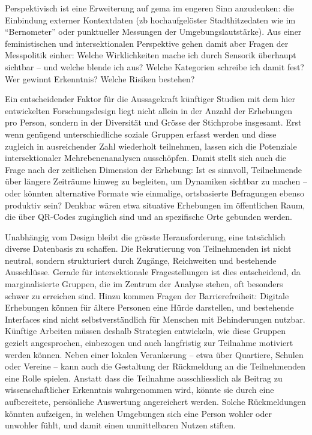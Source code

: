 Perspektivisch ist eine Erweiterung auf \gls{gema} im engeren Sinn anzudenken: die Einbindung externer Kontextdaten (\gls{zb} hochaufgelöster Stadthitzedaten wie im \enquote{Bernometer} \parencite[siehe][]{burgerModellingSpatialPattern2021} oder punktueller Messungen der Umgebungslautstärke). Aus einer feministischen und intersektionalen Perspektive gehen damit aber Fragen der Messpolitik einher: Welche Wirklichkeiten mache ich durch Sensorik überhaupt sichtbar -- und welche blende ich aus? Welche Kategorien schreibe ich damit fest? Wer gewinnt Erkenntnis? Welche Risiken bestehen?

Ein entscheidender Faktor für die Aussagekraft künftiger Studien mit dem hier entwickelten Forschungsdesign liegt nicht allein in der Anzahl der Erhebungen pro Person, sondern in der Diversität und Grösse der Stichprobe insgesamt. Erst wenn genügend unterschiedliche soziale Gruppen erfasst werden und diese zugleich in ausreichender Zahl wiederholt teilnehmen, lassen sich die Potenziale intersektionaler Mehrebenenanalysen ausschöpfen. Damit stellt sich auch die Frage nach der zeitlichen Dimension der Erhebung: Ist es sinnvoll, Teilnehmende über längere Zeiträume hinweg zu begleiten, um Dynamiken sichtbar zu machen -- oder könnten alternative Formate wie einmalige, ortsbasierte Befragungen ebenso produktiv sein? Denkbar wären etwa situative Erhebungen im öffentlichen Raum, die über QR-Codes zugänglich sind und an spezifische Orte gebunden werden.

Unabhängig vom Design bleibt die grösste Herausforderung, eine tatsächlich diverse Datenbasis zu schaffen. Die Rekrutierung von Teilnehmenden ist nicht neutral, sondern strukturiert durch Zugänge, Reichweiten und bestehende Ausschlüsse. Gerade für intersektionale Fragestellungen ist dies entscheidend, da marginalisierte Gruppen, die im Zentrum der Analyse stehen, oft besonders schwer zu erreichen sind. Hinzu kommen Fragen der Barrierefreiheit: Digitale Erhebungen können für ältere Personen eine Hürde darstellen, und bestehende Interfaces sind nicht selbstverständlich für Menschen mit Behinderungen nutzbar. Künftige Arbeiten müssen deshalb Strategien entwickeln, wie diese Gruppen gezielt angesprochen, einbezogen und auch langfristig zur Teilnahme motiviert werden können. Neben einer lokalen Verankerung -- etwa über Quartiere, Schulen oder Vereine -- kann auch die Gestaltung der Rückmeldung an die Teilnehmenden eine Rolle spielen. Anstatt dass die Teilnahme ausschliesslich als Beitrag zu wissenschaftlicher Erkenntnis wahrgenommen wird, könnte sie durch eine aufbereitete, persönliche Auswertung angereichert werden. Solche Rückmeldungen könnten aufzeigen, in welchen Umgebungen sich eine Person wohler oder unwohler fühlt, und damit einen unmittelbaren Nutzen stiften.

